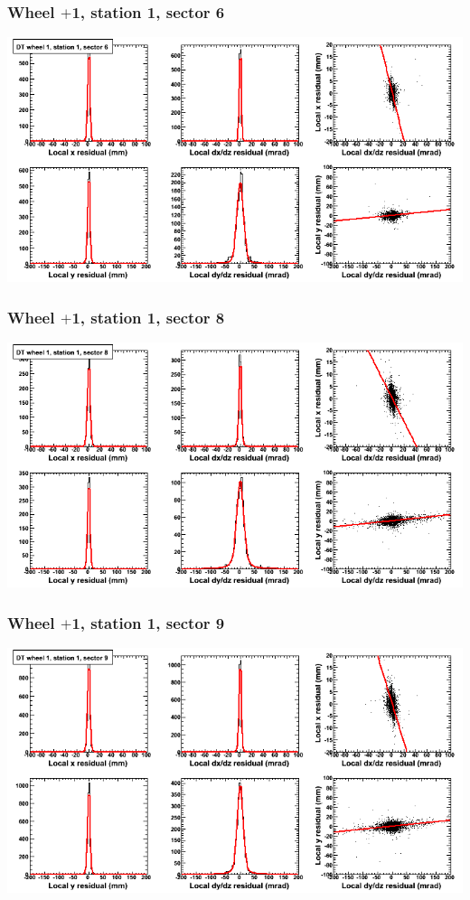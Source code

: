 \documentclass[compress]{beamer}
\begin{document}
\begin{frame}
\frametitle{Wheel $+$1, station 1, sector 6}
\includegraphics[width=\linewidth]{tmpbell_MBwhDst1sec06.png}
\end{frame}

\begin{frame}
\frametitle{Wheel $+$1, station 1, sector 8}
\includegraphics[width=\linewidth]{tmpbell_MBwhDst1sec08.png}
\end{frame}

\begin{frame}
\frametitle{Wheel $+$1, station 1, sector 9}
\includegraphics[width=\linewidth]{tmpbell_MBwhDst1sec09.png}
\end{frame}
\end{document}
